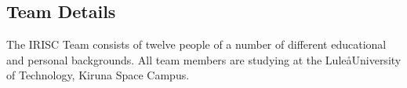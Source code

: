 \subsection{Team Details}

The IRISC Team consists of twelve people of a number of different educational and personal backgrounds. All team members are studying at the Lule\aa University of Technology, Kiruna Space Campus. 

\bigskip

